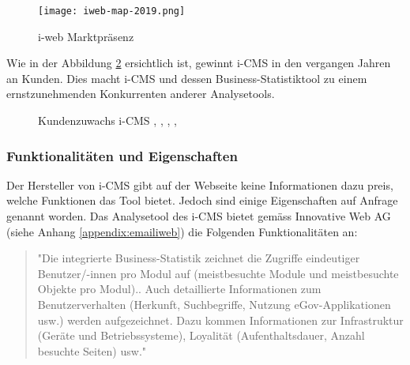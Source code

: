 \begin{figure}[h]
  \centering
  \texttt{[image: iweb-map-2019.png]}
  \caption{i-web Marktpräsenz \parencite[S. 14]{iweb2019revue}}
  \label{fig: iwebmap2019}
\end{figure}

Wie in der Abbildung \ref{fig:icmszuwachs} ersichtlich ist, gewinnt i-CMS in den vergangen Jahren an Kunden. Dies macht i-CMS und dessen Business-Statistiktool zu einem ernstzunehmenden Konkurrenten anderer Analysetools.  

\begin{figure}[h]
  \centering
  \caption{Kundenzuwachs i-CMS \parencite[S.7]{iweb2015revue}, \parencite[S. 7]{iweb2016revue}, \parencite[S. 7]{iweb2017revue}, \parencite[S. 14]{iweb2018revue}, \parencite[S. 14]{iweb2019revue}}
  \label{fig:icmszuwachs}
\end{figure}

\subsubsection{Funktionalitäten und Eigenschaften}
Der Hersteller von i-CMS gibt auf der Webseite keine Informationen dazu preis, welche Funktionen das Tool bietet. Jedoch sind einige Eigenschaften auf Anfrage genannt worden. Das Analysetool des i-CMS bietet gemäss Innovative Web AG (siehe Anhang \ref{appendix:emailiweb}) die Folgenden Funktionalitäten an:

\begin{quote}
  "Die integrierte Business-Statistik zeichnet die Zugriffe eindeutiger Benutzer/-innen pro Modul auf (meistbesuchte Module und meistbesuchte Objekte pro Modul).. Auch detaillierte Informationen zum Benutzerverhalten (Herkunft, Suchbegriffe, Nutzung eGov-Applikationen usw.) werden aufgezeichnet. Dazu kommen Informationen zur Infrastruktur (Geräte und Betriebssysteme), Loyalität (Aufenthaltsdauer, Anzahl besuchte Seiten) usw."
\end{quote}

